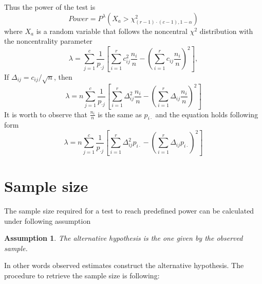 \documentclass{article}
\newtheorem{assumption}{Assumption}
\begin{document}
Thus the power of the test is
\begin{equation}
    Power = P^{\lambda}\left(X_a > \chi^2_{(r-1)\cdot(c-1),1-\alpha}\right)
\end{equation}
where $X_a$ is a random variable that follows the noncentral $\chi^2$ distribution with the noncentrality parameter
\begin{equation}
    \lambda = \sum_{j=1}^{c}\frac{1}{p_{\cdot j}}\left[ \sum_{i=1}^{r} c_{ij}^2 \frac{n_i}{n} -  \left(\sum_{i=1}^{r} c_{ij} \frac{n_i}{n}\right)^2  \right],
\end{equation}
If $\Delta_{ij} = c_{ij}/\sqrt{n}$, then 
\begin{equation}
    \lambda = n\sum_{j=1}^{c}\frac{1}{p_{\cdot j}}\left[ \sum_{i=1}^{r} \Delta_{ij}^2 \frac{n_i}{n} -  \left(\sum_{i=1}^{r} \Delta_{ij} \frac{n_i}{n}\right)^2  \right]
\end{equation}
It is worth to observe that $\frac{n_i}{n}$ is the same as $p_{i\cdot}$ and the equation holds following form
\begin{equation}\label{homogeneity_lambda}
    \lambda = n\sum_{j=1}^{c}\frac{1}{p_{\cdot j}}\left[ \sum_{i=1}^{r} \Delta_{ij}^2 p_{i\cdot} -  \left(\sum_{i=1}^{r} \Delta_{ij} p_{i\cdot}\right)^2  \right]
\end{equation}

\section{Sample size}
The sample size required for a test to reach predefined power can be calculated
under following assumption 

\begin{assumption}
The alternative hypothesis is the one given by the observed sample. 
\end{assumption} 
In other words observed estimates construct the alternative hypothesis. The 
procedure to retrieve the sample size is following:
\end{document}
